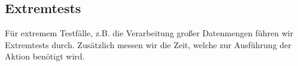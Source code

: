 %



\newpage



\subsection*{Extremtests}
\label{Abschnitt:Tests:Protokoll:Extrem}

Für extremem Testfälle, z.B. die Verarbeitung großer Datenmengen führen wir Extremtests durch.
Zusätzlich messen wir die Zeit, welche zur Ausführung der Aktion benötigt wird.





